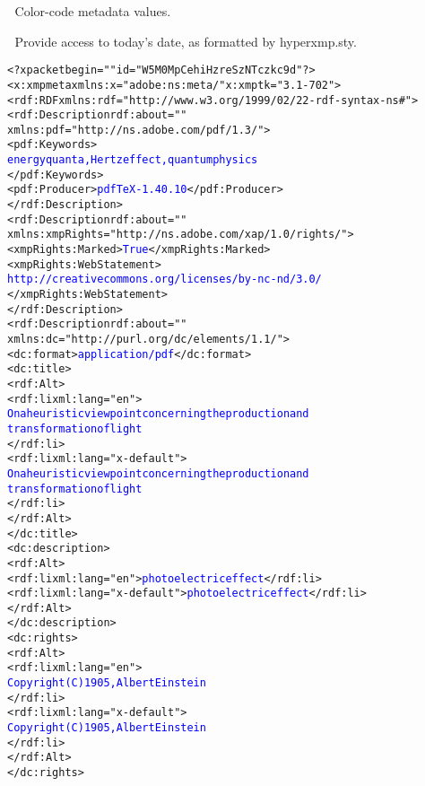 ^^A  Color-code metadata values.
\newcommand{\metavalue}[1]{\textcolor{blue}{#1}}

^^A  Provide access to today's date, as formatted by hyperxmp.sty.
\makeatletter
\let\todayISO=\hyxmp@today
\makeatother

\begin{alltt}
    <?xpacket begin="\string{}\string{}\string{}" id="W5M0MpCehiHzreSzNTczkc9d"?>
    <x:xmpmeta xmlns:x="adobe:ns:meta/" x:xmptk="3.1-702">
       <rdf:RDF xmlns:rdf="http://www.w3.org/1999/02/22-rdf-syntax-ns#">
          <rdf:Description rdf:about=""
               xmlns:pdf="http://ns.adobe.com/pdf/1.3/">
               <pdf:Keywords>
                 \metavalue{energy quanta, Hertz effect, quantum physics}
               </pdf:Keywords>
               <pdf:Producer>\metavalue{pdfTeX-1.40.10}</pdf:Producer>
          </rdf:Description>
          <rdf:Description rdf:about=""
               xmlns:xmpRights="http://ns.adobe.com/xap/1.0/rights/">
             <xmpRights:Marked>\metavalue{True}</xmpRights:Marked>
             <xmpRights:WebStatement>
               \metavalue{http://creativecommons.org/licenses/by-nc-nd/3.0/}
             </xmpRights:WebStatement>
          </rdf:Description>
          <rdf:Description rdf:about=""
                xmlns:dc="http://purl.org/dc/elements/1.1/">
             <dc:format>\metavalue{application/pdf}</dc:format>
             <dc:title>
                <rdf:Alt>
                   <rdf:li xml:lang="en">
                     \metavalue{On a heuristic viewpoint concerning the production and
                     transformation of light}
                   </rdf:li>
                   <rdf:li xml:lang="x-default">
                     \metavalue{On a heuristic viewpoint concerning the production and
                     transformation of light}
                   </rdf:li>
                </rdf:Alt>
             </dc:title>
             <dc:description>
                <rdf:Alt>
                   <rdf:li xml:lang="en">\metavalue{photoelectric effect}</rdf:li>
                   <rdf:li xml:lang="x-default">\metavalue{photoelectric effect}</rdf:li>
                </rdf:Alt>
             </dc:description>
             <dc:rights>
                <rdf:Alt>
                   <rdf:li xml:lang="en">
                     \metavalue{Copyright (C) 1905, Albert Einstein}
                   </rdf:li>
                   <rdf:li xml:lang="x-default">
                     \metavalue{Copyright (C) 1905, Albert Einstein}
                   </rdf:li>
                </rdf:Alt>
             </dc:rights>

\end{alltt}
